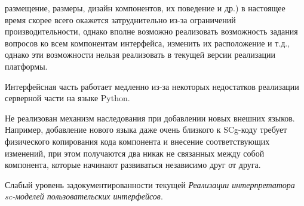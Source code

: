 \begin{scnitemize}
\begin{scnitemize}
\begin{scnitemize}
    размещение, размеры, дизайн компонентов, их поведение и др.) в настоящее время скорее всего окажется затруднительно
    из-за ограничений производительности, однако вполне возможно реализовать возможность задания вопросов ко всем
    компонентам интерфейса, изменить их расположение и т.д., однако эти возможности нельзя реализовать в текущей
    версии реализации платформы.
    \item Интерфейсная часть работает медленно из-за некоторых недостатков реализации серверной части на языке Python.
    \item Не реализован механизм наследования при добавлении новых внешних языков. Например, добавление нового языка
    даже очень близкого к SCg-коду требует физического копирования кода компонента и внесение соответствующих изменений,
    при этом получаются два никак не связанных между собой компонента, которые начинают развиваться независимо друг от
    друга.
    \item Слабый уровень задокументированности текущей \textit{Реализации интерпретатора sc-моделей пользовательских
    интерфейсов}.
\end{scnitemize}


\end{scnitemize}
\end{scnitemize}
